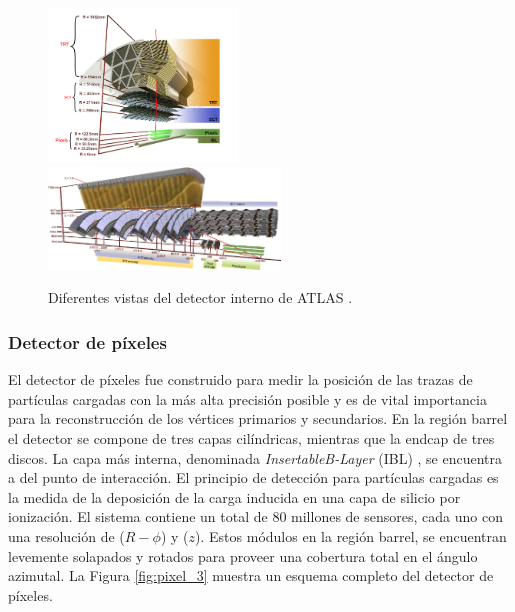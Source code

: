 \begin{figure}
  \centering
  \includegraphics[width=0.45\textwidth]{images/lhc/pixel_1.png}
  \includegraphics[width=0.55\textwidth]{images/lhc/pixel_4.png}
  \caption{Diferentes vistas del detector interno de ATLAS \cite{Pequenao:1095926,Kayl:1298112}.}
  \label{fig:pixel_23}
\end{figure}


\subsubsection{Detector de píxeles}

El detector de píxeles fue construido para medir la posición de las trazas de partículas cargadas con la más alta precisión posible y es de vital importancia para la reconstrucción de los vértices primarios y secundarios. En la región barrel el detector se compone de tres capas cilíndricas, mientras que la endcap de tres discos. La capa más interna, denominada \textit{InsertableB-Layer} (IBL) \cite{ATLAS-TDR-2010-19}, se encuentra a  del punto de interacción.
El principio de detección para partículas cargadas es la medida de la deposición de la carga inducida en una capa de silicio por ionización. El sistema contiene un total de $80$ millones de sensores, cada uno con una resolución de  ($R-\phi$) y  ($z$). Estos módulos en la región barrel, se encuentran levemente solapados y rotados para proveer una cobertura total en el ángulo azimutal. La Figura \ref{fig:pixel_3} muestra un esquema completo del detector de píxeles.

